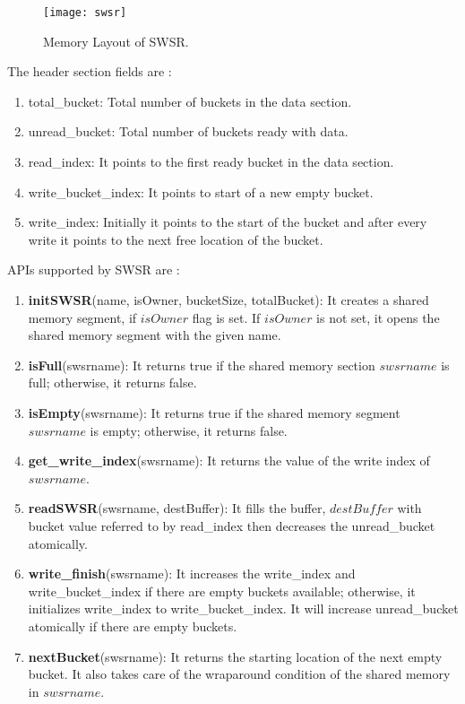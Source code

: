 	\begin{figure}[!htb]
	      \centering
	      \texttt{[image: swsr]}
	      \caption{Memory Layout of SWSR.} 
	      \label{swsr}
	\end{figure}

	The header section fields are :
	\begin{enumerate}
	 \item total\_bucket: Total number of buckets in the data section.
	 \item unread\_bucket: Total number of buckets ready with data.
	 \item read\_index: It points to the first ready bucket in the data section.
	 \item write\_bucket\_index: It points to start of a new empty bucket.
	 \item write\_index: Initially it points to the start of the bucket and after every write it points to the next free location of the bucket.
	\end{enumerate}
	
	APIs supported by SWSR are :
	\begin{enumerate}
	 \item {\bf initSWSR}(name, isOwner, bucketSize, totalBucket): It creates a shared memory segment, if $isOwner$ flag is set. If $isOwner$ is not set, it 
	 opens the shared memory segment with the given name.
	 \item {\bf isFull}(swsrname): It returns true if the shared memory section $swsrname$  is full; otherwise, it returns false.
	 \item {\bf isEmpty}(swsrname): It returns true if the shared memory segment $swsrname$ is empty; otherwise, it returns false.
	 \item {\bf get\_write\_index}(swsrname): It returns the value of the write index of $swsrname$.
	 \item {\bf readSWSR}(swsrname, destBuffer): It fills the buffer, $destBuffer$ with bucket value referred to by read\_index then decreases the unread\_bucket atomically.
	 \item {\bf write\_finish}(swsrname): It increases the write\_index and write\_bucket\_index
	      if there are empty buckets available; otherwise, it initializes write\_index to write\_bucket\_index. 
	      It will increase unread\_bucket atomically if there are empty buckets. 
	 \item {\bf nextBucket}(swsrname): It returns the starting location of the next empty bucket. It also takes care of the wraparound condition of the shared memory in $swsrname$.
	\end{enumerate}
	
